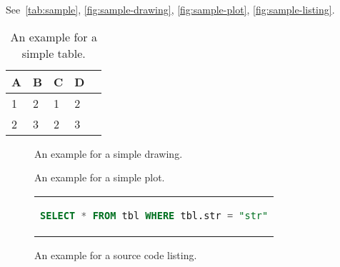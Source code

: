See~\autoref{tab:sample}, \autoref{fig:sample-drawing}, \autoref{fig:sample-plot}, \autoref{fig:sample-listing}.

\begin{table}[htpb]
  \caption[Example table]{An example for a simple table.}\label{tab:sample}
  \centering
  \begin{tabular}{l l l ll}
    \toprule
      A & B & C & D \\
    \midrule
      1 & 2 & 1 & 2 \\
      2 & 3 & 2 & 3 \\
    \bottomrule
  \end{tabular}
\end{table}

\begin{figure}[htpb]
  \centering
  \caption[Example drawing]{An example for a simple drawing.}\label{fig:sample-drawing}
\end{figure}

\begin{figure}[htpb]
  \centering

  \exampleA
  \exampleB
  \caption[Example plot]{An example for a simple plot.}\label{fig:sample-plot}
\end{figure}

\begin{figure}[htpb]
  \centering
  \begin{tabular}{c}
  \begin{lstlisting}[language=SQL]
    SELECT * FROM tbl WHERE tbl.str = "str"
  \end{lstlisting}
  \end{tabular}
  \caption[Example listing]{An example for a source code listing.}\label{fig:sample-listing}
\end{figure}



